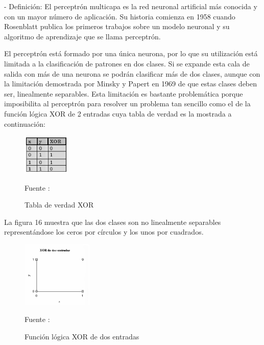 \documentclass[a4paper, 12pt]{article}
\begin{document}
\begin{enumerate}
- Definición:
\vskip 0.3cm
El perceptrón multicapa es la red neuronal artificial más conocida y con un mayor número de aplicación. Su historia comienza en 1958 cuando Rosenblatt publica los primeros trabajos sobre un modelo neuronal y su algoritmo de aprendizaje que se llama perceptrón.\par
El perceptrón está formado por una única neurona, por lo que su utilización está limitada a la clasificación de patrones en dos clases. Si se expande esta cala de salida con más de una neurona se podrán clasificar más de dos clases, aunque con la limitación demostrada por Minsky y Papert en 1969 de que estas clases deben ser, linealmente separables. Esta limitación es bastante problemática porque imposibilita al perceptrón para resolver un problema tan sencillo como el de la función lógica XOR de 2 entradas cuya tabla de verdad es la mostrada a continuación:\par
\vskip 2cm
\begin{figure}[ht]
\begin{center}
\includegraphics[width=0.2\textwidth]{tabla_xor}
\end{center}
\begin{center}
\caption{\small{Tabla de verdad XOR}}
{\small{Fuente : \cite{serrano}}}
\end{center}
\end{figure}

La figura 16 muestra que las dos clases son no linealmente separables representándose los ceros por círculos y los unos por cuadrados.\par
\begin{figure}[ht]
\begin{center}
\includegraphics[width=0.3\textwidth]{linealmente_separables}
\end{center}
\begin{center}
\caption{\small{Función lógica XOR de dos entradas}}
{\small{Fuente : \cite{serrano}}}
\end{center}
\end{figure}


\end{enumerate}
\end{document}
